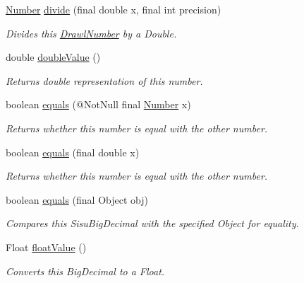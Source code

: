 \begin{DoxyCompactItemize}
\hyperlink{interfacecom_1_1aarrelaakso_1_1drawl_1_1_number}{Number} \hyperlink{interfacecom_1_1aarrelaakso_1_1drawl_1_1_number_aa4a70324e7a3dfd7da7fae72cb7fe5b5}{divide} (final double x, final int precision)
\begin{DoxyCompactList}\small\item\em Divides this \hyperlink{classcom_1_1aarrelaakso_1_1drawl_1_1_drawl_number}{Drawl\+Number} by a Double. \end{DoxyCompactList}\item 
double \hyperlink{interfacecom_1_1aarrelaakso_1_1drawl_1_1_number_ad409a636270d5fcc2591791a4e862179}{double\+Value} ()
\begin{DoxyCompactList}\small\item\em Returns double representation of this number. \end{DoxyCompactList}\item 
boolean \hyperlink{interfacecom_1_1aarrelaakso_1_1drawl_1_1_number_afe7ed1040e76bfb7a01c1e3835218827}{equals} (@Not\+Null final \hyperlink{interfacecom_1_1aarrelaakso_1_1drawl_1_1_number}{Number} x)
\begin{DoxyCompactList}\small\item\em Returns whether this number is equal with the other number. \end{DoxyCompactList}\item 
boolean \hyperlink{interfacecom_1_1aarrelaakso_1_1drawl_1_1_number_a102dab4f981a76317b20d69d352ddb15}{equals} (final double x)
\begin{DoxyCompactList}\small\item\em Returns whether this number is equal with the other number. \end{DoxyCompactList}\item 
boolean \hyperlink{interfacecom_1_1aarrelaakso_1_1drawl_1_1_number_a9cf883b0a5979a9f0420cca2c2ff9d89}{equals} (final Object obj)
\begin{DoxyCompactList}\small\item\em Compares this Sisu\+Big\+Decimal with the specified Object for equality. \end{DoxyCompactList}\item 
Float \hyperlink{interfacecom_1_1aarrelaakso_1_1drawl_1_1_number_ad6df5caf5478cc3f85cc808cf39a0610}{float\+Value} ()
\begin{DoxyCompactList}\small\item\em Converts this Big\+Decimal to a Float. \end{DoxyCompactList}\item 

\end{DoxyCompactItemize}
